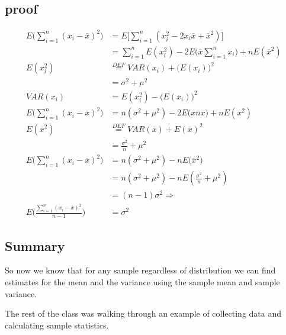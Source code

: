 \subsection{proof}
\begin{align*}
    E \Big( \displaystyle\sum_{i=1}^{n} (x_i - \overline{x})^2 \Big) &= E\Big[ \displaystyle\sum^{n}_{i=1} (x_i^2 -2x_i\overline{x} + \overline{x}^2)\Big] \\
    &= \displaystyle\sum^{n}_{i=1} E(x_i^2) -2 E \Big(\overline{x} \displaystyle\sum^{n}_{i=1} x_i \Big) + nE(\overline{x}^2) \\ 
    E(x_i^2) &\overset{DEF}{=} VAR(x_i) + \Big( E(x_i) \Big)^2 \\ 
    &= \sigma^2 + \mu^2 \\
    VAR(x_i) &= E(x_i^2) - \Big( E(x_i) \Big)^2 \\
    E \Big( \displaystyle\sum_{i=1}^{n} (x_i - \overline{x})^2 \Big) &= n(\sigma^2 +\mu^2) -2 E \Big(\overline{x} n \overline{x}  \Big) + nE(\overline{x}^2) \\
    E(\overline{x}^2) &\overset{DEF}{=} VAR(\overline{x}) + E(\overline{x})^2 \\
    &= \frac{\sigma^2}{n} + \mu^2 \\
    E \Big( \displaystyle\sum_{i=1}^{n} (x_i - \overline{x})^2 \Big) &= n(\sigma^2 +\mu^2) - nE \Big( \overline{x}^2  \Big)\\
    &= n(\sigma^2 + \mu^2) - nE(\frac{\sigma^2}{n}+\mu^2) \\
    &= (n-1)\sigma^2 \Rightarrow \\
    E \Bigg(\frac{ \displaystyle\sum_{i=1}^{n} (x_i - \overline{x})^2 }{n-1} \Bigg) &= \sigma^2
\end{align*}

\subsection{Summary}
So now we know that for any sample regardless of distribution we can find estimates for the mean and the variance using the sample mean and sample variance.

The rest of the class was walking through an example of collecting data and calculating sample statistics.